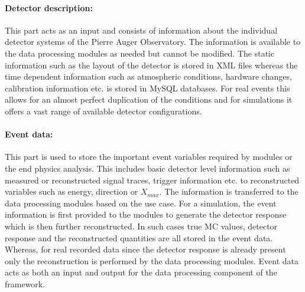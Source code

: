 \paragraph*{Detector description:}
This part acts as an input and consists of information about the individual detector systems of the Pierre Auger Observatory. The information is available to the data processing modules as needed but cannot be modified. The static information such as the layout of the detector is stored in XML files whereas the time dependent information such as atmospheric conditions, hardware changes, calibration information etc. is stored in MySQL databases. For real events this allows for an almost perfect duplication of the conditions and for simulations it offers a vast range of available detector configurations.  

\paragraph*{Event data:}
This part is used to store the important event variables required by modules or the end physics analysis. This includes basic detector level information such as measured or reconstructed signal traces, trigger information etc. to reconstructed variables such as energy, direction or $X_{max}$. The information is transferred to the data processing modules based on the use case. For a simulation, the event information is first provided to the modules to generate the detector response which is then further reconstructed. In such cases true MC values, detector response and the reconstructed quantities are all stored in the event data. Whereas, for real recorded data since the detector response is already present only the reconstruction is performed by the data processing modules. Event data acts as both an input and output for the data processing component of the framework.

